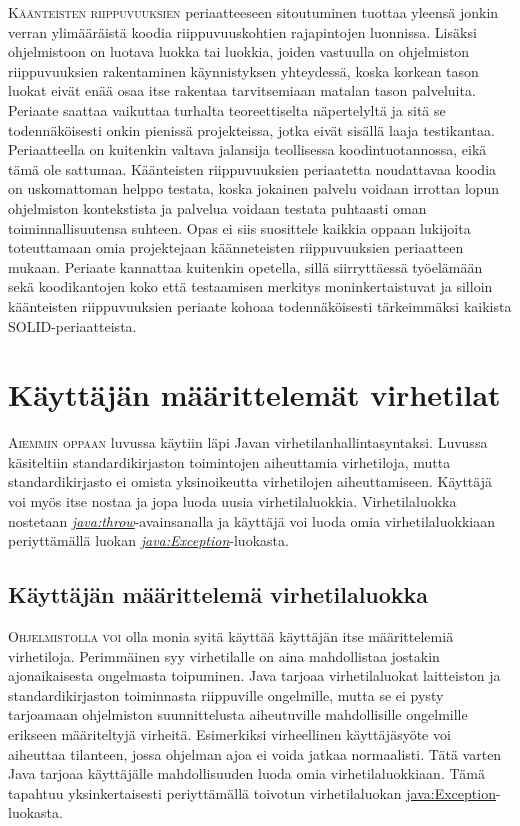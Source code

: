 \documentclass[openany]{book}
\newcommand{\newthought}[1]{\smallskip\textsc{#1}}
\newcommand{\java}[1]{\underline{\gls{java:#1}}}
\newcommand{\newjava}[1]{\textit{\java{#1}}}
\begin{document}
\newthought{Käänteisten riippuvuuksien} periaatteeseen sitoutuminen tuottaa yleensä jonkin verran
ylimääräistä koodia riippuvuuskohtien rajapintojen luonnissa. Lisäksi ohjelmistoon on luotava
luokka tai luokkia, joiden vastuulla on ohjelmiston riippuvuuksien rakentaminen käynnistyksen
yhteydessä, koska korkean tason luokat eivät enää osaa itse rakentaa tarvitsemiaan matalan tason
palveluita. Periaate saattaa vaikuttaa turhalta teoreettiselta näpertelyltä ja sitä se
todennäköisesti onkin pienissä projekteissa, jotka eivät sisällä laaja testikantaa. Periaatteella
on kuitenkin valtava jalansija teollisessa koodintuotannossa, eikä tämä ole sattumaa. Käänteisten
riippuvuuksien periaatetta noudattavaa koodia on uskomattoman helppo testata, koska jokainen
palvelu voidaan irrottaa lopun ohjelmiston kontekstista ja palvelua voidaan testata puhtaasti oman
toiminnallisuutensa suhteen. Opas ei siis suosittele kaikkia oppaan lukijoita toteuttamaan omia
projektejaan käänneteisten riippuvuuksien periaatteen mukaan. Periaate kannattaa kuitenkin
opetella, sillä siirryttäessä työelämään sekä koodikantojen koko että testaamisen merkitys
moninkertaistuvat ja silloin käänteisten riippuvuuksien periaate kohoaa todennäköisesti
tärkeimmäksi kaikista SOLID-periaatteista.


\section{Käyttäjän määrittelemät virhetilat}
\label{exception}

\newthought{Aiemmin oppaan} luvussa  käytiin läpi Javan
virhetilanhallintasyntaksi. Luvussa käsiteltiin standardikirjaston toimintojen aiheuttamia
virhetiloja, mutta standardikirjasto ei omista yksinoikeutta virhetilojen aiheuttamiseen. Käyttäjä
voi myös itse nostaa ja jopa luoda uusia virhetilaluokkia. Virhetilaluokka nostetaan
\newjava{throw}-avainsanalla ja käyttäjä voi luoda omia virhetilaluokkiaan periyttämällä luokan
\newjava{Exception}-luokasta.

\subsection{Käyttäjän määrittelemä virhetilaluokka}
\label{exception}

\newthought{Ohjelmistolla voi} olla monia syitä käyttää käyttäjän itse määrittelemiä virhetiloja.
Perimmäinen syy virhetilalle on aina mahdollistaa jostakin ajonaikaisesta ongelmasta toipuminen.
Java tarjoaa virhetilaluokat laitteiston ja standardikirjaston toiminnasta riippuville ongelmille,
mutta se ei pysty tarjoamaan ohjelmiston suunnittelusta aiheutuville mahdollisille ongelmille
erikseen määriteltyjä virheitä. Esimerkiksi virheellinen käyttäjäsyöte voi aiheuttaa tilanteen,
jossa ohjelman ajoa ei voida jatkaa normaalisti. Tätä varten Java tarjoaa käyttäjälle
mahdollisuuden luoda omia virhetilaluokkiaan. Tämä tapahtuu yksinkertaisesti periyttämällä
toivotun virhetilaluokan \java{Exception}-luokasta.
\end{document}
